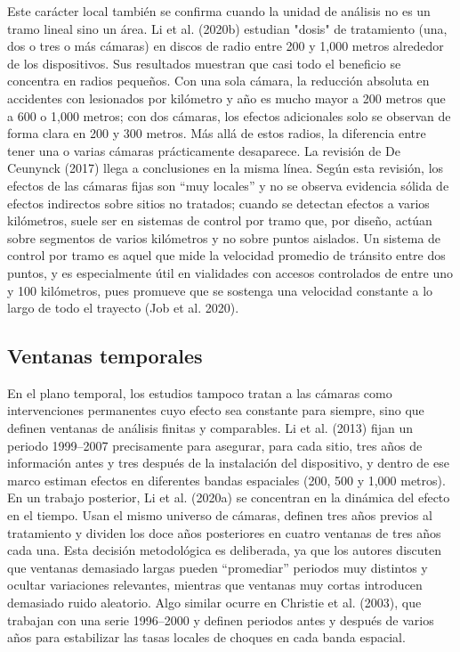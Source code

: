 \indent Este carácter local también se confirma cuando la unidad de análisis no es un tramo lineal sino un área. Li et al. (2020b) estudian "dosis" de tratamiento (una, dos o tres o más cámaras) en discos de radio entre 200 y 1,000 metros alrededor de los dispositivos. Sus resultados muestran que casi todo el beneficio se concentra en radios pequeños. Con una sola cámara, la reducción absoluta en accidentes con lesionados por kilómetro y año es mucho mayor a 200 metros que a 600 o 1,000 metros; con dos cámaras, los efectos adicionales solo se observan de forma clara en 200 y 300 metros. Más allá de estos radios, la diferencia entre tener una o varias cámaras prácticamente desaparece. La revisión de De Ceunynck (2017) llega a conclusiones en la misma línea. Según esta revisión, los efectos de las cámaras fijas son “muy locales” y no se observa evidencia sólida de efectos indirectos sobre sitios no tratados; cuando se detectan efectos a varios kilómetros, suele ser en sistemas de control por tramo que, por diseño, actúan sobre segmentos de varios kilómetros y no sobre puntos aislados. Un sistema de control por tramo es aquel que mide la velocidad promedio de tránsito entre dos puntos, y es especialmente útil en vialidades con accesos controlados de entre uno y 100 kilómetros, pues promueve que se sostenga una velocidad constante a lo largo de todo el trayecto (Job et al. 2020).

\subsection{Ventanas temporales}
\label{sec:ventanas-literatura}
\noindent En el plano temporal, los estudios tampoco tratan a las cámaras como intervenciones permanentes cuyo efecto sea constante para siempre, sino que definen ventanas de análisis finitas y comparables. Li et al. (2013) fijan un periodo 1999–2007 precisamente para asegurar, para cada sitio, tres años de información antes y tres después de la instalación del dispositivo, y dentro de ese marco estiman efectos en diferentes bandas espaciales (200, 500 y 1,000 metros). En un trabajo posterior, Li et al. (2020a) se concentran en la dinámica del efecto en el tiempo. Usan el mismo universo de cámaras, definen tres años previos al tratamiento y dividen los doce años posteriores en cuatro ventanas de tres años cada una. Esta decisión metodológica es deliberada, ya que los autores discuten que ventanas demasiado largas pueden “promediar” periodos muy distintos y ocultar variaciones relevantes, mientras que ventanas muy cortas introducen demasiado ruido aleatorio. Algo similar ocurre en Christie et al. (2003), que trabajan con una serie 1996–2000 y definen periodos antes y después de varios años para estabilizar las tasas locales de choques en cada banda espacial.

